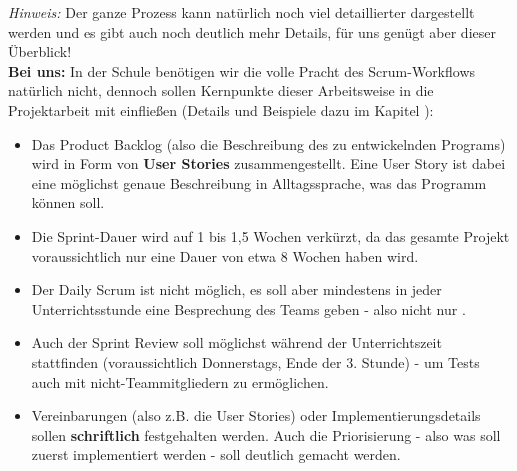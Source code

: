 \documentclass{article}
\begin{document}
\textit{Hinweis:} Der ganze Prozess kann natürlich noch viel detaillierter dargestellt werden und es gibt auch noch deutlich mehr Details, für uns genügt aber dieser Überblick! \\

\color{purp} \textbf{Bei uns:} \color{black} In der Schule benötigen wir die volle Pracht des Scrum-Workflows natürlich nicht, dennoch sollen Kernpunkte dieser Arbeitsweise in die Projektarbeit mit einfließen (Details und Beispiele dazu im Kapitel ):
\begin{itemize}
    \item Das Product Backlog (also die Beschreibung des zu entwickelnden Programs) wird in Form von \textbf{User Stories} zusammengestellt. Eine User Story ist dabei eine möglichst genaue Beschreibung in Alltagssprache, was das Programm können soll. 
    \item Die Sprint-Dauer wird auf 1 bis 1,5 Wochen verkürzt, da das gesamte Projekt voraussichtlich nur eine Dauer von etwa 8 Wochen haben wird. 
    \item Der Daily Scrum ist nicht möglich, es soll aber mindestens in jeder Unterrichtsstunde eine Besprechung des Teams geben - also nicht nur .
    \item Auch der Sprint Review soll möglichst während der Unterrichtszeit stattfinden (voraussichtlich Donnerstags, Ende der 3. Stunde) - um Tests auch mit nicht-Teammitgliedern zu ermöglichen. 
    \item Vereinbarungen (also z.B. die User Stories) oder Implementierungsdetails sollen \textbf{schriftlich} festgehalten werden. Auch die Priorisierung - also was soll zuerst implementiert werden - soll deutlich gemacht werden. 
\end{itemize}
\end{document}
